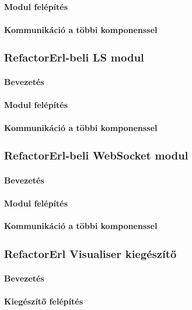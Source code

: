 \subsubsection{Modul felépítés}
\subsubsection{Kommunikáció a többi komponenssel}

\subsection{RefactorErl-beli LS modul}
\subsubsection{Bevezetés}
\subsubsection{Modul felépítés}
\subsubsection{Kommunikáció a többi komponenssel}

\subsection{RefactorErl-beli WebSocket modul}
\subsubsection{Bevezetés}
\subsubsection{Modul felépítés}
\subsubsection{Kommunikáció a többi komponenssel}


\subsection{RefactorErl Visualiser kiegészítő}
\subsubsection{Bevezetés}
\subsubsection{Kiegészítő felépítés}
